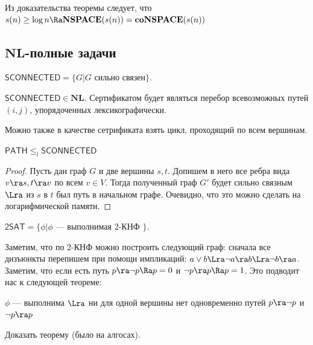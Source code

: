 \begin{corollary}
    Из доказательства теоремы следует, что \(s(n) \ge \log n \Ra \mathbf{NSPACE}(s(n)) = \mathbf{coNSPACE}(s(n))\)
\end{corollary}

\subsection{\(\mathbf{NL}\)-полные задачи}

\begin{definition}
    \(\mathsf{SCONNECTED} = \{G | G\text{ сильно связен}\}\).
\end{definition}

\begin{note}
    \(\mathsf{SCONNECTED} \in \mathbf{NL}\). Сертификатом будет являться перебор всевозможных путей \((i, j)\), упорядоченных лексикографически.

    Можно также в качестве сетрификата взять цикл, проходящий по всем вершинам.
\end{note}

\begin{proposition}
    \(\mathsf{PATH} \le_l \mathsf{SCONNECTED}\)
\end{proposition}
\begin{proof}
    Пусть дан граф \(G\) и две вершины \(s, t\). Допишем в него все ребра вида \(v \ra s, t \ra v\) по всем \(v \in V\). Тогда полученный граф \(G'\) будет сильно связным \(\Lra\) из \(s\) в \(t\) был путь в начальном графе. Очевидно, что это можно сделать на логарифмической памяти.
\end{proof}

\begin{definition}
    \(\mathsf{2SAT} = \{\phi | \phi\) --- выполнимая 2-КНФ \(\}\).
\end{definition}

Заметим, что по 2-КНФ можно построить следующий граф: сначала все дизъюнкты перепишем при помощи импликаций: \(a \vee b \Lra \neg a \ra b \Lra \neg b \ra a\). Заметим, что если есть путь \(p \ra \neg p \Ra p = 0\) и \(\neg p \ra p \Ra p = 1\). Это подводит нас к следующей теореме:

\begin{theorem}
    \(\phi\) --- выполнима \(\Lra\) ни для одной вершины нет одновременно путей \(p \ra \neg p\) и \(\neg p \ra p\)
\end{theorem}
\begin{exercise}
    Доказать теорему (было на алгосах).
\end{exercise}

